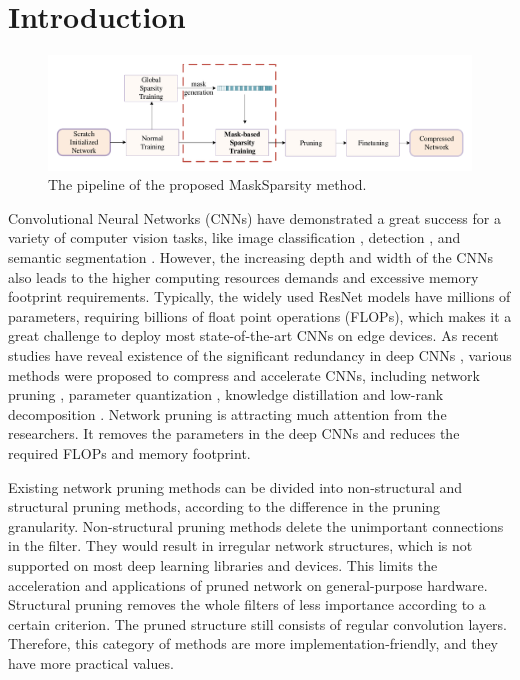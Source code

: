 \documentclass[review]{cvpr}
\begin{document}
\begin{abstract}
 
\end{abstract}

\section{Introduction}\label{introduction}

\begin{figure}[]
	\centering
	\includegraphics[width=0.95\linewidth]{figure/MaskSparsity.pdf}
	\vskip -0.1in
	\caption{The pipeline of the proposed MaskSparsity method.}
	\label{MAskSparsityPipeline}
	\vskip -0.15in
\end{figure}


Convolutional Neural Networks (CNNs) have demonstrated a great success for a variety of computer vision tasks, like image classification \cite{russakovsky2015imagenet}, detection \cite{lin2014microsoft}, and semantic segmentation \cite{Cordts2016Cityscapes}.  However, the increasing depth and width of the CNNs also leads to the higher computing resources demands and excessive memory footprint requirements. Typically, the widely used ResNet models \cite{he2016deep} have millions of parameters, requiring billions of float point operations (FLOPs), which makes it a great challenge to deploy most state-of-the-art CNNs on edge devices. As recent studies have reveal existence of the significant redundancy in deep CNNs \cite{denil2013predicting}, various methods were proposed to compress and accelerate CNNs, including network pruning \cite{li2020group}, parameter quantization \cite{jacob2018quantization}, knowledge distillation \cite{hinton2015distilling} and low-rank decomposition \cite{denton2014exploiting}. Network pruning is attracting much attention from the researchers. It removes the parameters in the deep CNNs and reduces the required FLOPs and memory footprint.

Existing network pruning methods can be divided into non-structural and structural pruning methods, according to the difference in the pruning granularity. Non-structural pruning methods delete the unimportant connections in the filter. They would result in irregular network structures, which is not supported on most deep learning libraries and devices. This limits the acceleration and applications of pruned network on general-purpose hardware. Structural pruning removes the whole filters of less importance according to a certain criterion. The pruned structure still consists of regular convolution layers. Therefore, this category of methods are more implementation-friendly, and they have more practical values. 
\end{document}
